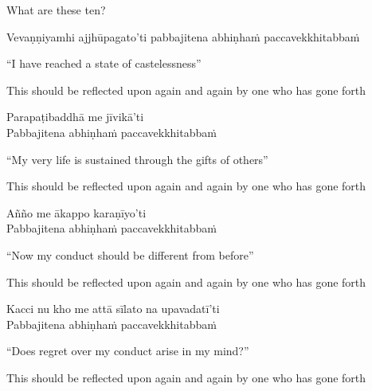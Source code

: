 \begin{english}
  What are these ten?
\end{english}

\begin{pali-hang}
Vevaṇṇiyamhi ajjhūpagato'ti pabbajitena abhiṇhaṁ paccavekkhitabbaṁ
\end{pali-hang}

\begin{english}
  ``I have reached a state of castelessness''\hyperlink{endnote99-appendix}{\hypertarget{endnote99-body}{}}
\begin{english-hangtogether}
  This should be reflected upon again and again by one who has gone forth
\end{english-hangtogether}
\end{english}

Parapaṭibaddhā me jīvikā'ti\\
Pabbajitena abhiṇhaṁ paccavekkhitabbaṁ

\begin{english}
  ``My very life is sustained through the gifts of others''
\begin{english-hangtogether}
  This should be reflected upon again and again by one who has gone forth
\end{english-hangtogether}
\end{english}

Añño me ākappo karaṇīyo'ti\\
Pabbajitena abhiṇhaṁ paccavekkhitabbaṁ

\begin{english}
  ``Now my conduct should be different from before''\hyperlink{endnote100-appendix}{\hypertarget{endnote100-body}{}}
\begin{english-hangtogether}
  This should be reflected upon again and again by one who has gone forth
\end{english-hangtogether}
\end{english}

Kacci nu kho me attā sīlato na upavadatī'ti\\
Pabbajitena abhiṇhaṁ paccavekkhitabbaṁ

\begin{english}
  ``Does regret over my conduct arise in my mind?''
\begin{english-hangtogether}
  This should be reflected upon again and again by one who has gone forth
\end{english-hangtogether}
\end{english}

